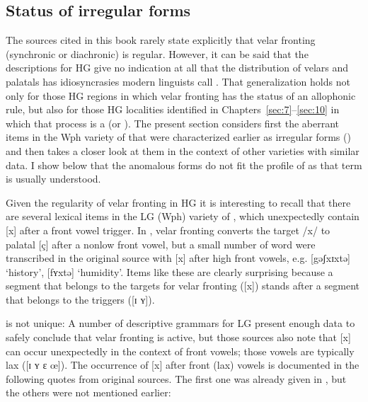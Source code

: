 \subsection{Status of irregular forms}\label{sec:12.8.3}

The sources cited in this book rarely state explicitly that velar fronting (synchronic or diachronic) is regular. However, it can be said that the descriptions for HG give no indication at all that the distribution of velars and palatals has idiosyncrasies modern linguists call . That generalization holds not only for those HG regions in which velar fronting has the status of an allophonic rule, but also for those HG localities identified in Chapters~\ref{sec:7}--\ref{sec:10} in which that process is a  (or ). The present section considers first the aberrant items in the Wph variety of   that were characterized earlier as irregular forms () and then takes a closer look at them in the context of other varieties with similar data. I show below that the anomalous forms do not fit the profile of  as that term is usually understood.

Given the regularity of velar fronting in HG it is interesting to recall that there are several lexical items in the LG (Wph) variety of  \citep{Martin1925}, which unexpectedly contain [x] after a front vowel trigger. In , velar fronting converts the target /x/ to palatal [ç] after a nonlow front vowel, but a small number of word were transcribed in the original source with [x] after high front vowels, e.g. [gəʃxɪxtə] ‘history’, [fʏxtə] ‘humidity’. Items like these are clearly surprising because a segment that belongs to the targets for velar fronting ([x]) stands after a segment that belongs to the triggers ([ɪ ʏ]).

\begin{sloppypar}
 is not unique: A number of descriptive grammars for LG present enough data to safely conclude that velar fronting is active, but those sources also note that [x] can occur unexpectedly in the context of front vowels; those vowels are typically lax ([ɪ ʏ ɛ œ]). The occurrence of [x] after front (lax) vowels is documented in the following quotes from original sources. The first one \citep{Martin1925} was already given in , but the others were not mentioned earlier:
\end{sloppypar}

